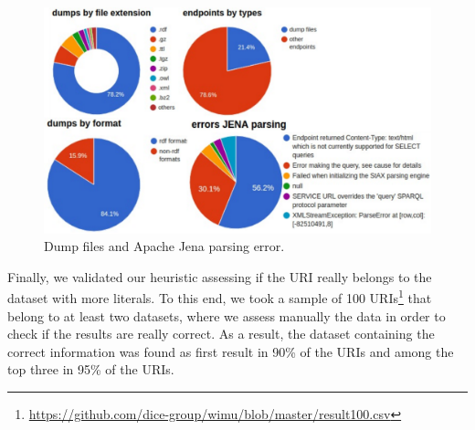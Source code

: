 \begin{figure}[htp] 
	\centering
	\includegraphics[width=340pt]{img/dumps3.pdf}
	\caption{Dump files and Apache Jena parsing error.}
	\label{fig:dumps}
\end{figure}

Finally, we validated our heuristic assessing if the URI really belongs to the dataset with more literals.
To this end, we took a sample of 100 URIs\footnote{\url{https://github.com/dice-group/wimu/blob/master/result100.csv}} that belong to at least two datasets, where we assess manually the data in order to check if the results are really correct. 
As a result, the dataset containing the correct information was found as first result in 90\% of the URIs and among the top three in 95\% of the URIs.



